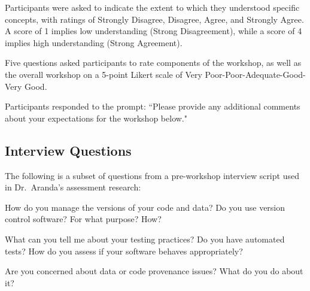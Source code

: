 \documentclass{proposalnsf}
\begin{document}
\begin{compactitem}
\item Participants were asked to indicate the extent to which they understood specific concepts, with ratings of Strongly Disagree, Disagree, Agree, and Strongly Agree. A score of 1 implies low understanding (Strong Disagreement), while a score of 4 implies high understanding (Strong Agreement).


\item Five questions asked participants to rate components of the
workshop, as well as the overall workshop on a 5-point Likert scale of Very Poor-Poor-Adequate-Good-Very Good. %

\item Participants responded to the prompt: ``Please provide any additional comments about your expectations for the workshop below."
\end{compactitem}

\subsection{Interview Questions}
\label{sec:interview}

The following is a subset of questions from a pre-workshop interview 
script used in Dr.\ Aranda's assessment research:

\begin{compactitem}


\item How do you manage the versions of your code and data? Do you use version control software? For what purpose? How?

\item What can you tell me about your testing practices? Do you have automated tests? How do you assess if your software behaves appropriately?

\item Are you concerned about data or code provenance issues? What do you do about it?
\end{compactitem}
\end{document}
